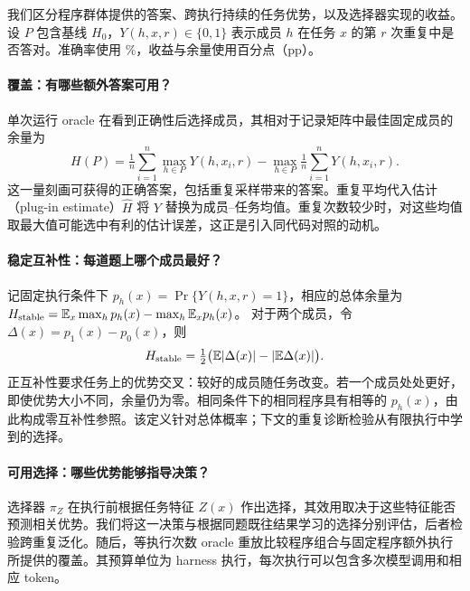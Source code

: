 我们区分程序群体提供的答案、跨执行持续的任务优势，以及选择器实现的收益。设 $P$ 包含基线 $H_0$，$Y(h,x,r)\in\{0,1\}$ 表示成员 $h$ 在任务 $x$ 的第 $r$ 次重复中是否答对。准确率使用 \%，收益与余量使用百分点（pp）。

\paragraph{覆盖：有哪些额外答案可用？}
单次运行 oracle 在看到正确性后选择成员，其相对于记录矩阵中最佳固定成员的余量为
\begin{equation}
H(P)=\tfrac1n\sum_{i=1}^n\max_{h\in P}Y(h,x_i,r)
-\max_{h\in P}\tfrac1n\sum_{i=1}^nY(h,x_i,r).
\label{eq:headroom}
\end{equation}
这一量刻画可获得的正确答案，包括重复采样带来的答案。重复平均代入估计（plug-in estimate）$\widehat H$ 将 $Y$ 替换为成员--任务均值。重复次数较少时，对这些均值取最大值可能选中有利的估计误差，这正是引入同代码对照的动机。

\paragraph{稳定互补性：每道题上哪个成员最好？}
记固定执行条件下 $p_h(x)=\Pr\{Y(h,x,r)=1\}$，相应的总体余量为
$H_{\rm stable}=\mathbb E_x\max_h p_h(x)-\max_h\mathbb E_x p_h(x)$。
对于两个成员，令 $\Delta(x)=p_1(x)-p_0(x)$，则
\begin{equation}
H_{\rm stable}=\tfrac12\bigl(\mathbb E|\Delta(x)|-|\mathbb E\Delta(x)|\bigr).
\label{eq:identity}
\end{equation}
正互补性要求任务上的优势交叉：较好的成员随任务改变。若一个成员处处更好，即使优势大小不同，余量仍为零。相同条件下的相同程序具有相等的 $p_h(x)$，由此构成零互补性参照。该定义针对总体概率；下文的重复诊断检验从有限执行中学到的选择。

\paragraph{可用选择：哪些优势能够指导决策？}
选择器 $\pi_Z$ 在执行前根据任务特征 $Z(x)$ 作出选择，其效用取决于这些特征能否预测相关优势。我们将这一决策与根据同题既往结果学习的选择分别评估，后者检验跨重复泛化。随后，等执行次数 oracle 重放比较程序组合与固定程序额外执行所提供的覆盖。其预算单位为 harness 执行，每次执行可以包含多次模型调用和相应 token。
